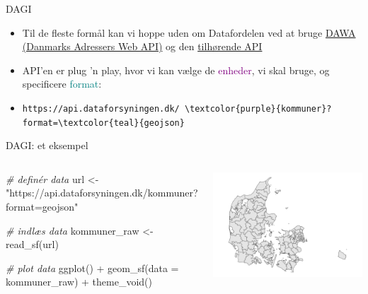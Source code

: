 \documentclass[
  8pt,
  ignorenonframetext,
  aspectratio=169]{beamer}
\newenvironment{Shaded}{}{}
\newcommand{\AttributeTok}[1]{\textcolor[rgb]{0.49,0.56,0.16}{#1}}
\newcommand{\CommentTok}[1]{\textcolor[rgb]{0.38,0.63,0.69}{\textit{#1}}}
\newcommand{\FunctionTok}[1]{\textcolor[rgb]{0.02,0.16,0.49}{#1}}
\newcommand{\NormalTok}[1]{#1}
\newcommand{\OtherTok}[1]{\textcolor[rgb]{0.00,0.44,0.13}{#1}}
\newcommand{\SpecialCharTok}[1]{\textcolor[rgb]{0.25,0.44,0.63}{#1}}
\newcommand{\StringTok}[1]{\textcolor[rgb]{0.25,0.44,0.63}{#1}}
\newcommand{\columnsbegin}{\begin{columns}}
\newcommand{\columnsend}{\end{columns}}
\begin{document}
\begin{frame}{DAGI}
\protect\hypertarget{dagi-1}{}
\begin{itemize}
\item
  Til de fleste formål kan vi hoppe uden om Datafordelen ved at bruge
  \href{https://dawadocs.dataforsyningen.dk/dok/dagi}{DAWA (Danmarks
  Adressers Web API)} og den
  \href{https://dawadocs.dataforsyningen.dk/dok/api\#dagi}{tilhørende
  API}
\item
  API'en er plug 'n play, hvor vi kan vælge de
  \textcolor{purple}{enheder}, vi skal bruge, og specificere
  \textcolor{teal}{format}:
\item
  \nolinkurl{https://api.dataforsyningen.dk/ \textcolor{purple}{kommuner}?format=\textcolor{teal}{geojson}}
\end{itemize}
\end{frame}

\begin{frame}[fragile]{DAGI: et eksempel}
\protect\hypertarget{dagi-et-eksempel}{}
\columnsbegin
{}

\tiny

\begin{Shaded}
\begin{Highlighting}[]
\CommentTok{\# definér data}
\NormalTok{url }\OtherTok{\textless{}{-}} 
  \StringTok{"https://api.dataforsyningen.dk/kommuner?format=geojson"}

\CommentTok{\# indlæs data}
\NormalTok{kommuner\_raw }\OtherTok{\textless{}{-}} 
  \FunctionTok{read\_sf}\NormalTok{(url)}

\CommentTok{\# plot data}
\FunctionTok{ggplot}\NormalTok{() }\SpecialCharTok{+}
  \FunctionTok{geom\_sf}\NormalTok{(}\AttributeTok{data =}\NormalTok{ kommuner\_raw) }\SpecialCharTok{+}
  \FunctionTok{theme\_void}\NormalTok{()}
\end{Highlighting}
\end{Shaded}

\normalsize {}

\tiny

\includegraphics{crashcourse_slides_files/figure-beamer/unnamed-chunk-28-1.pdf}

\normalsize \columnsend
\end{frame}
\end{document}
